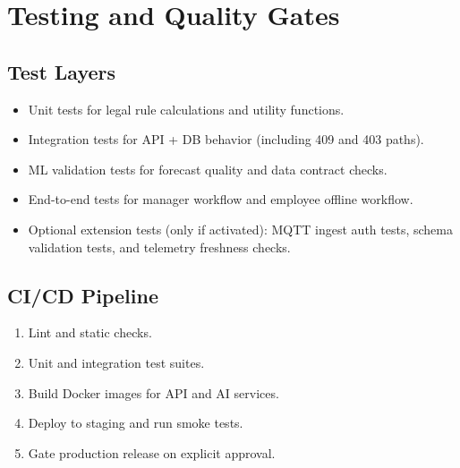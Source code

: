 \documentclass[11pt,a4paper]{article}
\begin{document}
\section{Testing and Quality Gates}
\subsection{Test Layers}
\begin{itemize}
  \item Unit tests for legal rule calculations and utility functions.
  \item Integration tests for API + DB behavior (including 409 and 403 paths).
  \item ML validation tests for forecast quality and data contract checks.
  \item End-to-end tests for manager workflow and employee offline workflow.
  \item Optional extension tests (only if activated): MQTT ingest auth tests, schema validation tests, and telemetry freshness checks.
\end{itemize}

\subsection{CI/CD Pipeline}
\begin{enumerate}
  \item Lint and static checks.
  \item Unit and integration test suites.
  \item Build Docker images for API and AI services.
  \item Deploy to staging and run smoke tests.
  \item Gate production release on explicit approval.
\end{enumerate}
\end{document}

